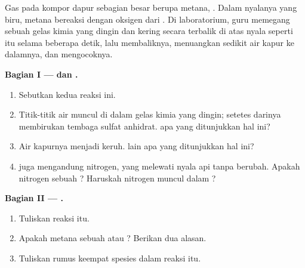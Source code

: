 \begin{problem}
\label{pb:g7:chemical-reactions:1}
Gas pada kompor dapur sebagian besar berupa metana, . Dalam
nyalanya yang biru, metana bereaksi dengan oksigen dari . Di
laboratorium, guru memegang sebuah gelas kimia yang dingin dan kering
secara terbalik di atas nyala seperti itu selama beberapa detik, lalu
membaliknya, menuangkan sedikit air kapur ke dalamnya, dan mengocoknya.

\medskip
\noindent\textbf{Bagian I ---  dan .}
\begin{enumerate}
  \item Sebutkan kedua  reaksi ini.
  \item Titik-titik air muncul di dalam gelas kimia yang dingin; setetes
        darinya membirukan tembaga sulfat anhidrat.  apa yang
        ditunjukkan hal ini?
  \item Air kapurnya menjadi keruh.  lain apa yang ditunjukkan hal
        ini?
  \item {} juga mengandung nitrogen, yang melewati nyala api tanpa
        berubah. Apakah nitrogen sebuah ? Haruskah nitrogen
        muncul dalam ?
\end{enumerate}

\medskip
\noindent\textbf{Bagian II --- .}
\begin{enumerate}[resume]
  \item Tuliskan  reaksi itu.
  \item Apakah  metana sebuah  atau ? Berikan dua alasan.
  \item Tuliskan rumus keempat spesies dalam reaksi itu.
\end{enumerate}


\end{problem}
